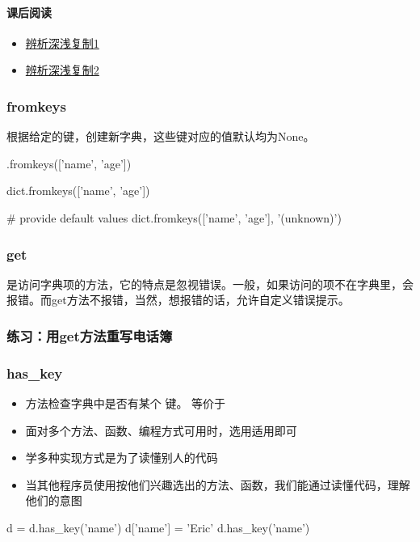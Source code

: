 \paragraph{课后阅读}
\begin{itemize}
\item \href{https://docs.python.org/2/library/copy.html}{辨析深浅复制1}
\item \href{https://www.quora.com/What-is-deep-copy-and-shallow-copy-in-Python}{辨析深浅复制2}
\end{itemize}
\subsubsection{fromkeys}
根据给定的键，创建新字典，这些键对应的值默认均为None。
\begin{python}
{}.fromkeys(['name', 'age'])

dict.fromkeys(['name', 'age'])

# provide default values
dict.fromkeys(['name', 'age'], '(unknown)')
\end{python}
\subsubsection{get}
是访问字典项的方法，它的特点是忽视错误。一般，如果访问的项不在字典里，会报错。而get方法不报错，当然，想报错的话，允许自定义错误提示。
\subsubsection{练习：用get方法重写电话簿}
\subsubsection{has\_key}
\begin{itemize}
\item {}方法检查字典中是否有某个
  键。 等价于
\item 面对多个方法、函数、编程方式可用时，选用适用即可
\item 学多种实现方式是为了读懂别人的代码
\item 当其他程序员使用按他们兴趣选出的方法、函数，我们能通过读懂代码，理解他们的意图
\end{itemize}
\begin{python}
d = {}
d.has_key('name')
d['name'] = 'Eric'
d.has_key('name')
\end{python}
